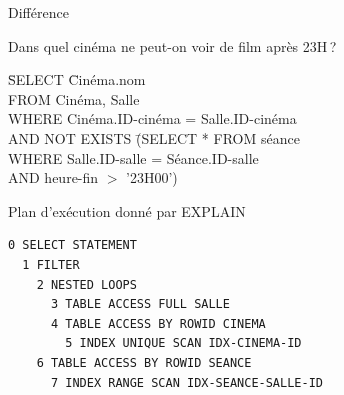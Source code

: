\begin{frame}{Différence}{


Dans quel cinéma ne peut-on voir de film après 23H\,?
\begin{tabbing}
  \=  SELECT \= Cinéma.nom \\
  \>  FROM   \> Cinéma, Salle\\
  \>  WHERE  \> Cinéma.ID-cinéma = Salle.ID-cinéma\\
  \>  AND    \> NOT EXISTS \= (SELECT * FROM séance\\
 \>         \>             \> WHERE  Salle.ID-salle = Séance.ID-salle\\
 \>         \>             \> AND    heure-fin $>$ '23H00')
\end{tabbing}
}\end{frame}

\begin{frame}{Plan d'exécution donné par EXPLAIN}
{

\begin{verbatim}
0 SELECT STATEMENT
  1 FILTER
    2 NESTED LOOPS
      3 TABLE ACCESS FULL SALLE
      4 TABLE ACCESS BY ROWID CINEMA
        5 INDEX UNIQUE SCAN IDX-CINEMA-ID
    6 TABLE ACCESS BY ROWID SEANCE
      7 INDEX RANGE SCAN IDX-SEANCE-SALLE-ID
\end{verbatim}
}\end{frame}


